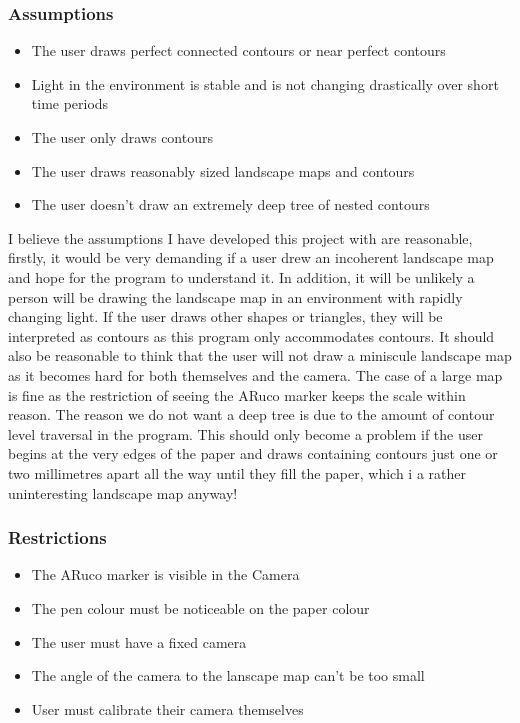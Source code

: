 \documentclass[11pt]{article}
\begin{document}
\subsubsection{Assumptions}
\begin{itemize}
    \item The user draws perfect connected contours or near 
    	  perfect contours
    \item Light in the environment is stable and is not
    	  changing drastically over short time periods
    \item The user only draws contours
    \item The user draws reasonably sized landscape maps and contours
    \item The user doesn't draw an extremely deep tree of nested contours
\end{itemize}

I believe the assumptions I have developed this project with are reasonable,
firstly, it would be very demanding if a user drew an incoherent landscape
map and hope for the program to understand it. In addition, it will be
unlikely a person will be drawing the landscape map in an environment
with rapidly changing light. If the user draws other shapes or triangles,
they will be interpreted as contours as this program only accommodates contours.
It should also be reasonable to think that the user will not draw a 
miniscule landscape map as it becomes hard for both themselves and the camera.
The case of a large map is fine as the restriction of seeing the ARuco 
marker keeps the scale within reason. The reason we do not want a deep
tree is due to the amount of contour level traversal in the program. This
should only become a problem if the user begins at the very edges of the paper
and draws containing contours just one or two millimetres apart all the
way until they fill the paper, which i a rather uninteresting landscape map
anyway!

\subsubsection{Restrictions}
\begin{itemize}
    \item The ARuco marker is visible in the Camera
    \item The pen colour must be noticeable on the paper colour
    \item The user must have a fixed camera
    \item The angle of the camera to the lanscape map can't be too small
   	\item User must calibrate their camera themselves          
\end{itemize}
\end{document}
